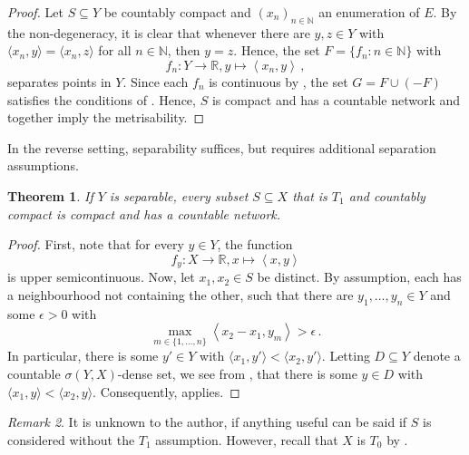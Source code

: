 \documentclass[
	paper=A4,
	pagesize=auto,
	fontsize=12pt
]{scrartcl}
\theoremstyle{plain}
\newtheorem{theorem}{Theorem}[section]
\theoremstyle{remark}
\newtheorem{remark}[theorem]{Remark}
\theoremstyle{definition}
\begin{document}
\begin{proof}
Let $S \subseteq Y$ be countably compact and $(x_n)_{n \in \mathbb{N}}$ an enumeration of $E$.
By the non-degeneracy, it is clear that whenever there are $y, z \in Y$ with $\langle x_n, y \rangle = \langle x_n, z \rangle$ for all $n \in \mathbb{N}$, then $y = z$.
Hence, the set $F = \{ f_n : n \in \mathbb{N} \}$ with
%
\begin{equation}
f_n : Y \to \mathbb{R}, y \mapsto \left< x_n, y \right> \, ,
\end{equation}
%
separates points in $Y$.
Since each $f_n$ is continuous by , the set $G = F \cup (-F)$ satisfies the conditions of .
Hence, $S$ is compact and has a countable network
 and \cite[Theorem 3.1.19]{src:Engelking:GeneralTopology} together imply the metrisability.
\end{proof}
%
In the reverse setting, separability suffices, but requires additional separation assumptions.
%
\begin{theorem}
\label{thm:SeparableDualImpliesQuasimetrisableComplicatedSetsBase}
If $Y$ is separable, every subset $S \subseteq X$ that is $T_1$ and countably compact is compact and has a countable network.
\end{theorem}
\begin{proof}
First, note that for every $y \in Y$, the function
%
\begin{equation}
f_y : X \to \mathbb{R}, x \mapsto \left< x, y \right>
\end{equation}
%
is upper semicontinuous.
Now, let $x_1, x_2 \in S$ be distinct.
By assumption, each has a neighbourhood not containing the other, such that there are $y_1, \dots, y_n \in Y$ and some $\epsilon > 0$ with
%
\begin{equation}
\max_{m \in \{1, \dots, n \}} \left< x_2 - x_1, y_m \right>
>
\epsilon \, .
\end{equation}
%
In particular, there is some $y' \in Y$ with $\langle x_1, y' \rangle < \langle x_2, y' \rangle$.
Letting $D \subseteq Y$ denote a countable $\sigma(Y, X)$-dense set, we see from , that there is some $y \in D$ with $\langle x_1, y \rangle < \langle x_2, y \rangle$.
Consequently,  applies.
\end{proof}
%
\begin{remark}
It is unknown to the author, if anything useful can be said if $S$ is considered without the $T_1$ assumption.
However, recall that $X$ is $T_0$ by .
\end{remark}
\end{document}

